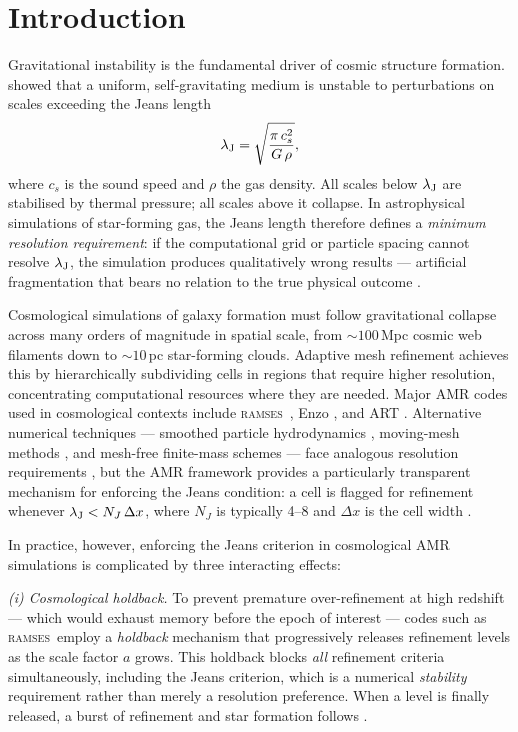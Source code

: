 \documentclass[fleqn,usenatbib]{mnras}
\newcommand{\lJ}{\lambda_{\rm J}}
\newcommand{\dx}{\Delta x}
\newcommand{\ramses}{\textsc{ramses}}
\begin{document}
\section{Introduction}
\label{sec:intro}

Gravitational instability is the fundamental driver of cosmic
structure formation.  \citet{Jeans1902} showed that a uniform,
self-gravitating medium is unstable to perturbations on scales
exceeding the Jeans length
\begin{equation}
  \lJ = \sqrt{\frac{\pi\,c_s^2}{G\,\rho}},
  \label{eq:jeans_intro}
\end{equation}
where $c_s$ is the sound speed and $\rho$ the gas density.  All
scales below $\lJ$ are stabilised by thermal pressure; all scales
above it collapse.  In astrophysical simulations of star-forming gas,
the Jeans length therefore defines a \emph{minimum resolution
requirement}: if the computational grid or particle spacing cannot
resolve $\lJ$, the simulation produces qualitatively wrong results
--- artificial fragmentation that bears no relation to the true
physical outcome \citep{Truelove1997, Bate1997}.

Cosmological simulations of galaxy formation must follow
gravitational collapse across many orders of magnitude in spatial
scale, from $\sim 100\,$Mpc cosmic web filaments down to
$\sim 10\,$pc star-forming clouds.  Adaptive mesh refinement
\citep[AMR;][]{Berger1984, Berger1989} achieves this by
hierarchically subdividing cells in regions that require higher
resolution, concentrating computational resources where they are
needed.  Major AMR codes used in cosmological contexts include
\ramses\ \citep{Teyssier2002}, Enzo \citep{Bryan2014}, and ART
\citep{Kravtsov1997}.  Alternative numerical techniques --- smoothed
particle hydrodynamics \citep[SPH;][]{Springel2005}, moving-mesh
methods \citep{Springel2010}, and mesh-free finite-mass schemes
\citep{Hopkins2015} --- face analogous resolution requirements
\citep{Bate1997, Nelson2009}, but the AMR framework provides a
particularly transparent mechanism for enforcing the Jeans condition:
a cell is flagged for refinement whenever $\lJ < N_J\,\dx$, where
$N_J$ is typically 4--8 and $\dx$ is the cell width
\citep{Truelove1997}.

In practice, however, enforcing the Jeans criterion in cosmological
AMR simulations is complicated by three interacting effects:

\textit{(i) Cosmological holdback.}  To prevent premature
over-refinement at high redshift --- which would exhaust memory
before the epoch of interest --- codes such as \ramses\ employ a
\emph{holdback} mechanism that progressively releases refinement
levels as the scale factor $a$ grows.  This holdback blocks
\emph{all} refinement criteria simultaneously, including the Jeans
criterion, which is a numerical \emph{stability} requirement rather
than merely a resolution preference.  When a level is finally
released, a burst of refinement and star formation follows
\citep[see also][]{Dubois2014, Dubois2021}.
\end{document}
